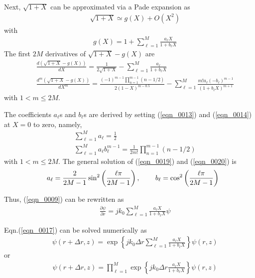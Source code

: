 \documentclass[journal,onecolumn]{IEEEtran}
\begin{document}
Next, $\sqrt{1 + X}$ can be approximated via a Pade expansion as \cite{MDC_HOPA} 
\begin{eqnarray}
&&\sqrt{1 + X} \simeq g(X) + O(X^2)
\label{eqn_0010} 
\end{eqnarray}
with 
\begin{eqnarray}
&&g(X) = 1 + \sum^M_{\ell = 1} \frac{a_\ell X}{1 + b_\ell X}
\label{eqn_0011}
\end{eqnarray}
The first $2M$ derivatives of $\sqrt{1 + X} - g(X)$ are  
\begin{eqnarray}
&&\frac{d (\sqrt{1 + X} - g(X))}{d X} = \frac{1}{2 \sqrt{1 + X}} - \sum^M_{\ell = 1} \frac{ a_\ell}{1 + b_\ell X}
\label{eqn_0012} \\
&&\frac{d^m (\sqrt{1 + X} - g(X))}{d X^m} = \frac{\displaystyle (-1)^{m - 1} \prod^{m - 1}_{n = 1} (n - 1/2) }{2 (1 - X)^{m - 0.5}} 
- \sum^M_{\ell = 1} \frac{m! a_\ell(-b_\ell)^{m - 1}}{(1 + b_\ell X)^{m + 1}} 
\label{eqn_0013} 
\end{eqnarray}
with $1 < m \leq 2M$. 

The coefficients $a_{\ell}$s and $b_{\ell}$s are derived by setting (\ref{eqn_0013}) and (\ref{eqn_0014}) at $X = 0$ to zero, namely,
\begin{eqnarray}
&&\sum^M_{\ell = 1} a_\ell = \frac{1}{2}
\label{eqn_0014} \\
&&\sum^M_{\ell = 1} a_\ell b_\ell^{m - 1} = \frac{1}{2 m!} \prod^{m - 1}_{n = 1} (n - 1/2) 
\label{eqn_0015} 
\end{eqnarray}
with $1 < m \leq 2M$. 
The general solution of (\ref{eqn_0019}) and (\ref{eqn_0020}) is 
\begin{eqnarray}
&&a_\ell = \frac{2}{2 M - 1} \sin^2 \left( \frac{\ell \pi}{2 M - 1} \right), 
\hspace{0.3in} b_\ell =  \cos^2 \left( \frac{\ell \pi}{2 M - 1} \right)
\label{eqn_0016}
\end{eqnarray}

Thus, (\ref{eqn_0009}) can be rewritten as 
\begin{eqnarray}
&&\frac{\partial \psi}{\partial r} = j k_0 \sum^M_{\ell = 1} \frac{a_\ell X}{1 + b_\ell X} \psi
\label{eqn_0017}
\end{eqnarray}

Eqn.(\ref{eqn_0017}) can be solved numerically as
\begin{eqnarray}
&&\psi (r + \Delta r, z) = \exp \left\{j k_0 \Delta r \sum^M_{\ell = 1} \frac{a_\ell X}{1 + b_\ell X} \right\} \psi(r, z) 
\label{eqn_0018}
\end{eqnarray}
or 
\begin{eqnarray}
&&\psi (r + \Delta r, z) = \prod^M_{\ell = 1} \exp \left\{ j k_0 \Delta r \frac{a_\ell X}{1 + b_\ell X} \right\} \psi(r, z)
\label{eqn_0019}
\end{eqnarray}
\end{document}
